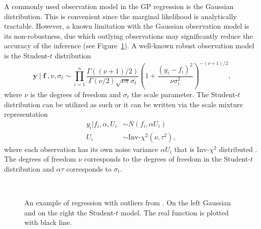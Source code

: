 \documentclass[twoside,11pt]{article}
\DeclareMathOperator{\f}{\mathbf{f}}
\DeclareMathOperator{\y}{\mathbf{y}}
\begin{document}
A commonly used observation model in the GP regression is the Gaussian 
distribution. This is convenient since the marginal likelihood is
analytically tractable. However, a known limitation with the Gaussian
observation model is its non-robustness, due which outlying
observations may significantly reduce the accuracy of the inference
(see Figure~\ref{single_obs_figure}).  A well-known robust observation
model is the Student-$t$ distribution \citep{OHagan:1979}
%
\begin{equation}
 \y | \f, \nu, \sigma_t  \sim \prod_{i=1}^n \frac{\Gamma((\nu+1)/2)}{\Gamma(\nu/2)\sqrt{\nu\pi}\sigma_t}\left(1 +
  \frac{(y_i-f_i)^2}{\nu\sigma_t^2} \right)^{-(\nu+1)/2},
\end{equation}
%
where $\nu$ is the degrees of freedom and $\sigma_t$ the scale
parameter.  The Student-$t$ distribution can be utilized as such or it
can be written via the scale mixture representation
%
\begin{align}
y_i | f_i,\alpha, U_i & \sim N(f_i, \alpha U_i) \label{eq_scale_mixture_1}\\
U_i & \sim \text{Inv-}\chi^2(\nu, \tau^2), \label{eq_scale_mixture_2}
\end{align}
%
where each observation has its own noise variance $\alpha U_i$ that is
$\text{Inv-}\chi^2$ distributed
\citep{Neal:1997,Gelman+etal+BDA3:2013}. The degrees of freedom $\nu$
corresponds to the degrees of freedom in the Student-$t$ distribution 
and $\alpha\tau$ corresponds to $\sigma_t$.

\begin{figure}
  \begin{center}
    ~
  \end{center}\caption{An example of regression with outliers from
    \citep{Neal:1997}. On the left Gaussian and on the right the
    Student-$t$ model.  The real function is plotted with
    black line.}
  \label{single_obs_figure} 
\end{figure}
\end{document}
